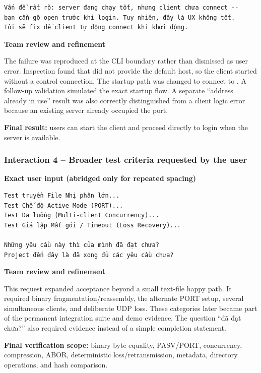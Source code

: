 \begin{lstlisting}
Vấn đề rất rõ: server đang chạy tốt, nhưng client chưa connect --
bạn cần gõ open trước khi login. Tuy nhiên, đây là UX không tốt.
Tôi sẽ fix để client tự động connect khi khởi động.
\end{lstlisting}

\textbf{Team review and refinement}

The failure was reproduced at the CLI boundary rather than dismissed as user
error. Inspection found that  did not provide the default host,
so the client started without a control connection. The startup path was
changed to connect to . A follow-up validation simulated
the exact startup flow. A separate ``address already in use'' result was also
correctly distinguished from a client logic error because an existing server
already occupied the port.

\textbf{Final result:} users can start the client and proceed directly to
login when the server is available.

\subsubsection{Interaction 4 -- Broader test criteria requested by the user}

\sourceA

\textbf{Exact user input (abridged only for repeated spacing)}

\begin{lstlisting}
Test truyền File Nhị phân lớn...
Test Chế độ Active Mode (PORT)...
Test Đa luồng (Multi-client Concurrency)...
Test Giả lập Mất gói / Timeout (Loss Recovery)...

Những yêu cầu này thì của mình đã đạt chưa?
Project đến đây là đã xong đủ các yêu cầu chưa?
\end{lstlisting}

\textbf{Team review and refinement}

This request expanded acceptance beyond a small text-file happy path. It
required binary fragmentation/reassembly, the alternate PORT setup, several
simultaneous clients, and deliberate UDP loss. These categories later became
part of the permanent integration suite and demo evidence. The question
``đã đạt chưa?'' also required evidence instead of a simple completion
statement.

\textbf{Final verification scope:} binary byte equality, PASV/PORT,
concurrency, compression, ABOR, deterministic loss/retransmission, metadata,
directory operations, and hash comparison.

